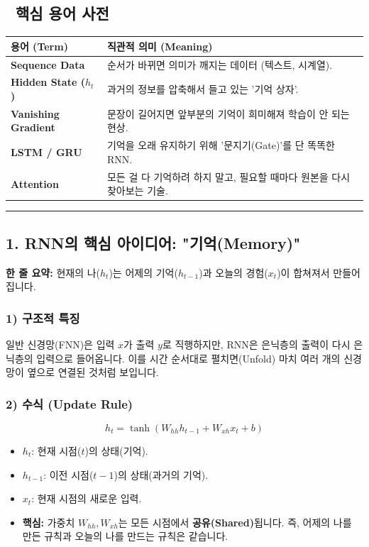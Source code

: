 \documentclass[11pt,a4paper]{book}
\theoremstyle{definition}
\begin{document}
\subsection*{📝 핵심 용어 사전}
\begin{table}[h]
\centering
\begin{tabularx}{\textwidth}{|p{}|X|}
\hline
\textbf{용어 (Term)} & \textbf{직관적 의미 (Meaning)} \\
\hline
\textbf{Sequence Data} & 순서가 바뀌면 의미가 깨지는 데이터 (텍스트, 시계열). \\
\hline
\textbf{Hidden State ($h_t$)} & 과거의 정보를 압축해서 들고 있는 '기억 상자'. \\
\hline
\textbf{Vanishing Gradient} & 문장이 길어지면 앞부분의 기억이 희미해져 학습이 안 되는 현상. \\
\hline
\textbf{LSTM / GRU} & 기억을 오래 유지하기 위해 '문지기(Gate)'를 단 똑똑한 RNN. \\
\hline
\textbf{Attention} & 모든 걸 다 기억하려 하지 말고, 필요할 때마다 원본을 다시 찾아보는 기술. \\
\hline
\end{tabularx}
\end{table}

\vspace{0.5cm}\hrule\vspace{0.5cm}

\subsection{1. RNN의 핵심 아이디어: "기억(Memory)"}


\begin{conceptbox}[title={개념 1: 돌림 노래 (Loop)}]
\textbf{한 줄 요약:} 현재의 나($h_t$)는 어제의 기억($h_{t-1}$)과 오늘의 경험($x_t$)이 합쳐져서 만들어집니다.
\end{conceptbox}

\subsubsection*{1) 구조적 특징}
일반 신경망(FNN)은 입력 $x$가 출력 $y$로 직행하지만, RNN은 은닉층의 출력이 다시 은닉층의 입력으로 들어옵니다. 이를 시간 순서대로 펼치면(Unfold) 마치 여러 개의 신경망이 옆으로 연결된 것처럼 보입니다.

\subsubsection*{2) 수식 (Update Rule)}
$$ h_t = \tanh(W_{hh} h_{t-1} + W_{xh} x_t + b) $$
\begin{itemize}
    \item $h_t$: 현재 시점($t$)의 상태(기억).
    \item $h_{t-1}$: 이전 시점($t-1$)의 상태(과거의 기억).
    \item $x_t$: 현재 시점의 새로운 입력.
    \item \textbf{핵심:} 가중치 $W_{hh}, W_{xh}$는 모든 시점에서 \textbf{공유(Shared)}됩니다. 즉, 어제의 나를 만든 규칙과 오늘의 나를 만드는 규칙은 같습니다.
\end{itemize}
\end{document}
